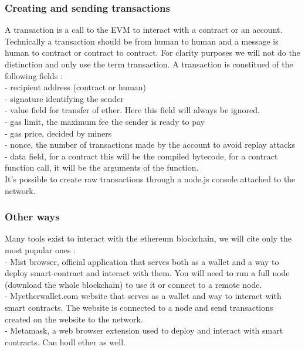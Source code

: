 \documentclass[11pt, a4paper, twoside, openright]{article} %
\begin{document}
\subsubsection{Creating and sending transactions}
A transaction is a call to the EVM to interact with a contract or an account. Technically a transaction should be from human to human and a message is human to contract or contract to contract. For clarity purposes we will not do the distinction and only use the term transaction. A transaction is constitued of the following fields : \\
- recipient address (contract or human) \\
- signature identifying the sender \\
- value field for transfer of ether. Here this field will always be ignored.\\
- gas limit, the maximum fee the sender is ready to pay \\
- gas price, decided by miners \\
- nonce, the number of transactions made by the account to avoid replay attacks\\
- data field, for a contract this will be the compiled bytecode, for a contract function call, it will be the arguments of the function. \\

It's possible to create raw transactions through a node.js console attached to the network.


\subsubsection{Other ways}
Many tools exist to interact with the ethereum blockchain, we will cite only the most popular ones : \\
- Mist browser, official application that serves both as a wallet and a way to deploy smart-contract and interact with them. You will need to run a full node (download the whole blockchain) to use it or connect to a remote node.\\
- Myetherwallet.com website that serves as a wallet and way to interact with smart contracts. The website is connected to a node and send transactions created on the website to the network. \\
- Metamask, a web browser extension used to deploy and interact with smart contracts. Can hodl ether as well.
\end{document}
